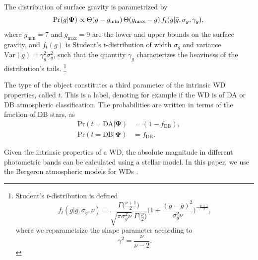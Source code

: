 \documentclass[fleqn,usenatbib]{mnras}
\newcommand{\popp}{\boldsymbol{\Psi}}
\newcommand{\logg}{g}
\newcommand{\pr}{\text{Pr}}
\begin{document}
The distribution of surface gravity is parametrized by
\begin{equation}\label{eq:T&g}
    \pr(\logg | \popp) \propto \Theta(\logg - \logg_\text{min}) \, \Theta(\logg_\text{max} - \logg) \, f_t(\logg|\bar{g},\sigma_g,\gamma_g),\\
\end{equation}
where $\logg_\text{min}=7$ and $\logg_\text{max}=9$ are the lower and upper bounds on the surface gravity, and $f_t(\logg)$ is Student's $t$-distribution of width $\sigma_g$ and variance $\text{Var}(g) = \gamma_g^2 \sigma_g^2$, such that the quantity $\gamma_g$ characterizes the heaviness of the distribution's tails.
\footnote{
Student's $t$-distribution is defined
\begin{equation}
	f_t(\logg|\bar{g},\sigma_g,\nu) =
	\frac{\Gamma\big( \frac{\nu+1}{2} \big)}{\sqrt{\pi\sigma_g^2\nu}\;\Gamma\big( \frac{\nu}{2} \big)}
	\Bigg( 1+\frac{(\logg-\bar{g})^2}{\sigma_g^2\nu} \Bigg)^{-\frac{\nu+1}{2}},
\end{equation}
where we reparametrize the shape parameter according to
\begin{equation}
	\gamma^2 = \frac{\nu}{\nu-2}.
\end{equation}
}

The type of the object constitutes a third parameter of the intrinsic WD properties, called $t$. This is a label, denoting for example if the WD is of DA or DB atmospheric classification. The probabilities are written in terms of the fraction of DB stars, as
\begin{equation}\label{eq:DADB}
\begin{split}
	\pr(t=\text{DA} | \popp) & = (1-f_\text{DB}),\\
    \pr(t=\text{DB} | \popp) & = f_\text{DB}.
\end{split}
\end{equation}

Given the intrinsic properties of a WD, the absolute magnitude in different photometric bands can be calculated using a stellar model. In this paper, we use the Bergeron atmospheric models for WDs \citep{Bergeron:1995we,Finley:1997zz,Bergeron:2000ce,2001PASP..113..409F}.
\end{document}
